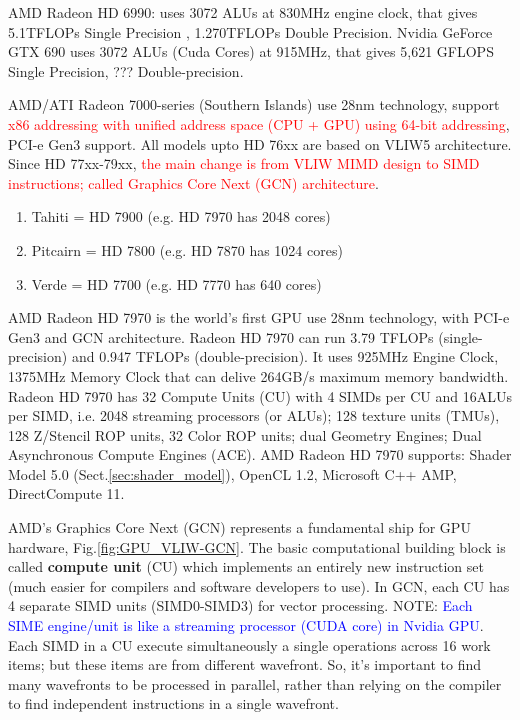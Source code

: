 AMD Radeon HD 6990: uses 3072 ALUs at 830MHz engine clock, that gives 5.1TFLOPs
Single Precision , 1.270TFLOPs Double Precision. Nvidia GeForce GTX 690 uses
3072 ALUs (Cuda Cores) at 915MHz, that gives 5,621 GFLOPS Single Precision, ???
Double-precision.

AMD/ATI Radeon 7000-series (Southern Islands) use 28nm technology, support
\textcolor{red}{x86 addressing with unified address space (CPU + GPU) using
64-bit addressing}, PCI-e Gen3 support. All models upto HD 76xx are based on
VLIW5 architecture. Since HD 77xx-79xx, \textcolor{red}{the main change is from
VLIW MIMD design to SIMD instructions; called Graphics Core Next (GCN) architecture}.
\begin{enumerate}
  \item Tahiti = HD 7900 (e.g. HD 7970 has 2048 cores)
  \item Pitcairn = HD 7800 (e.g. HD 7870 has 1024 cores)
  \item Verde = HD 7700 (e.g. HD 7770 has 640 cores)
\end{enumerate} 

AMD Radeon HD 7970 is the world's first GPU use 28nm technology, with PCI-e Gen3
and GCN architecture. Radeon HD 7970 can run 3.79 TFLOPs (single-precision) and
0.947 TFLOPs (double-precision). It uses 925MHz Engine Clock, 1375MHz Memory
Clock that can delive 264GB/s maximum memory bandwidth. Radeon HD 7970 has 32
Compute Units (CU) with 4 SIMDs per CU and 16ALUs per SIMD, i.e. 2048 streaming
processors (or ALUs); 128 texture units (TMUs), 128 Z/Stencil ROP units, 32
Color ROP units; dual Geometry Engines; Dual Asynchronous Compute Engines (ACE). AMD
Radeon HD 7970 supports: Shader Model 5.0 (Sect.\ref{sec:shader_model}), OpenCL
1.2, Microsoft C++ AMP, DirectCompute 11.

AMD's Graphics Core Next (GCN) represents a fundamental ship for GPU hardware,
Fig.\ref{fig:GPU_VLIW-GCN}. The basic computational building block is called
{\bf compute unit} (CU) which implements an entirely new instruction set (much
easier for compilers and software developers to use). In GCN, each CU has 4
separate SIMD units (SIMD0-SIMD3) for vector processing. NOTE:
\textcolor{blue}{Each SIME engine/unit is like a streaming processor (CUDA core)
in Nvidia GPU}. Each SIMD in a CU execute simultaneously a single operations
across 16 work items; but these items are from different wavefront. So, it's
important to find many wavefronts to be processed in parallel, rather than
relying on the compiler to find independent instructions in a single wavefront.

